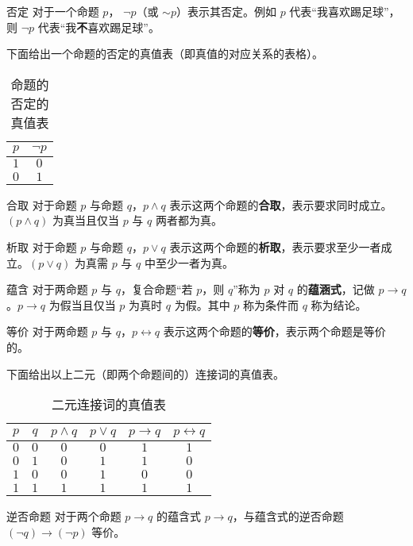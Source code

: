 
\begin{definition}{否定}
对于一个命题 $p$， $\neg p$（或 $\sim p$）表示其否定。例如 $p$ 代表“我喜欢踢足球”，则 $\neg p$ 代表“我\textbf{不}喜欢踢足球”。
\end{definition}

下面给出一个命题的否定的真值表（即真值的对应关系的表格）。
\begin{table}[ht]
\centering
\caption{命题的否定的真值表}\label{tab_propco1}
\begin{tabular}{|c|c|}
\hline
$p$ & $\neg p$ \\
\hline
$1$ & $0$ \\
\hline
$0$ & $1$ \\
\hline
\end{tabular}
\end{table}


\begin{definition}{合取}
对于命题 $p$ 与命题 $q$，$p \land q$ 表示这两个命题的\textbf{合取}，表示要求同时成立。$(p \land q)$ 为真当且仅当 $p$ 与 $q$ 两者都为真。
\end{definition}

\begin{definition}{析取}
对于命题 $p$ 与命题 $q$，$p \lor q$ 表示这两个命题的\textbf{析取}，表示要求至少一者成立。$(p \lor q)$ 为真需 $p$ 与 $q$ 中至少一者为真。
\end{definition}

\begin{definition}{蕴含}
对于两命题 $p$ 与 $q$，复合命题“若 $p$，则 $q$”称为 $p$ 对 $q$ 的\textbf{蕴涵式}，记做 $p \to q$。$p \to q$ 为假当且仅当 $p$ 为真时 $q$ 为假。其中 $p$ 称为条件而 $q$ 称为结论。
\end{definition}

\begin{definition}{等价}
对于两命题 $p$ 与 $q$，$p \leftrightarrow q$ 表示这两个命题的\textbf{等价}，表示两个命题是等价的。
\end{definition}

下面给出以上二元（即两个命题间的）连接词的真值表。
\begin{table}[ht]
\centering
\caption{二元连接词的真值表}\label{tab_propco2}
\begin{tabular}{|c|c|c|c|c|c|}
\hline
$p$ & $q$ & $p \land q$ & $p \lor q$ & $p \to q$ & $p \leftrightarrow q$ \\
\hline
$0$ & $0$ & $0$ & $0$ & $1$ & $1$ \\
\hline
$0$ & $1$ & $0$ & $1$ & $1$ & $0$ \\
\hline
$1$ & $0$ & $0$ & $1$ & $0$ & $0$ \\
\hline
$1$ & $1$ & $1$ & $1$ & $1$ & $1$ \\
\hline
\end{tabular}
\end{table}


\begin{theorem}{逆否命题}
对于两个命题 $p \rightarrow q$ 的蕴含式 $p \rightarrow q$，与蕴含式的逆否命题 $(\neg q) \rightarrow (\neg p)$ 等价。
\end{theorem}